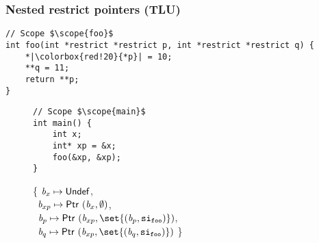 \begin{frame}[fragile]
\frametitle{Nested restrict pointers (TLU)}
\begin{verbatim}
// Scope $\scope{foo}$
int foo(int *restrict *restrict p, int *restrict *restrict q) {
    *|\colorbox{red!20}{*p}| = 10;
    **q = 11;
    return **p;
}
\end{verbatim}

\vspace*{-2cm}

\begin{figure}[!h]
\begin{minipage}[t]{.36\textwidth}
\begin{verbatim}
// Scope $\scope{main}$
int main() {
    int x;
    int* xp = &x;
    foo(&xp, &xp);
}
\end{verbatim}
\end{minipage}%
\begin{minipage}{.64\textwidth}

\executionannotation
{
\{ $\textit{b}_x \mapsto \mathsf{Undef}$, \\
    \ $\textit{b}_{xp} \mapsto \mathsf{Ptr} \ (\textit{b}_x, \emptyset)$, \\
    \ $\Blockvar_p \mapsto \ptr{(\Blockvar_{xp}, \set{(\Blockvar_p, \scope{foo})})}$, \\
    \ $\Blockvar_q \mapsto \ptr{(\Blockvar_{xp}, \set{(\Blockvar_q, \scope{foo})})}$ \}
}
{
}

\end{minipage}
\end{figure}


\end{frame}



